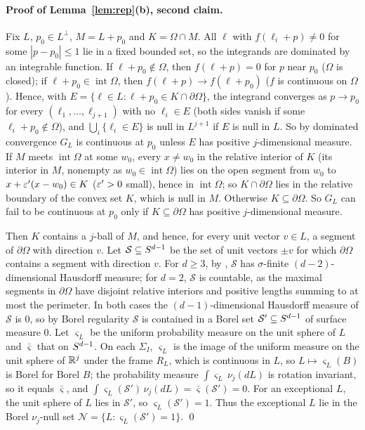 \documentclass[11pt]{article}
\begin{document}
\paragraph{Proof of Lemma~\ref{lem:rep}(b), second claim.} Fix $L$, $p_0\in L^\perp$, $M=L+p_0$ and $K=\Omega\cap M$. All $\ell$ with
$f(\ell_i+p)\ne0$ for some $|p-p_0|\le1$ lie in a fixed bounded set, so the integrands are dominated by an integrable function. If
$\ell+p_0\notin\Omega$, then $f(\ell+p)=0$ for $p$ near $p_0$ ($\Omega$ is closed); if $\ell+p_0\in\operatorname{int}\Omega$, then $f(\ell+p)\to f(\ell+p_0)$ ($f$
is continuous on $\Omega$). Hence, with $E=\{\ell\in L:\ell+p_0\in K\cap\partial\Omega\}$, the integrand converges as $p\to p_0$ for every $(\ell_1,\dots,\ell_{j+1})$
with no $\ell_i\in E$ (both sides vanish if some $\ell_i+p_0\notin\Omega$), and $\bigcup_i\{\ell_i\in E\}$ is null in $L^{j+1}$ if $E$ is null in $L$.
So by dominated convergence $G_L$ is continuous at $p_0$ unless $E$ has positive $j$-dimensional measure. If $M$ meets $\operatorname{int}\Omega$ at some $w_0$, every $x\ne w_0$ in the relative interior of $K$ (its interior in $M$, nonempty as $w_0\in\operatorname{int}\Omega$) lies on the open
segment from $w_0$ to $x+\varepsilon'(x-w_0)\in K$ ($\varepsilon'>0$ small), hence in $\operatorname{int}\Omega$; so $K\cap\partial\Omega$ lies in the relative boundary of
the convex set $K$, which is null in $M$. Otherwise $K\subseteq\partial\Omega$. So $G_L$ can fail to be continuous at $p_0$ only if $K\subseteq\partial\Omega$
has positive $j$-dimensional measure.

Then $K$ contains a $j$-ball of $M$, and hence, for every unit vector $v\in L$, a segment of $\partial\Omega$ with direction $v$. Let
$\mathcal S\subseteq S^{d-1}$ be the set of unit vectors $\pm v$ for which $\partial\Omega$ contains a segment with direction $v$. For $d\ge3$, by
\cite[Theorem~1]{ELR}, $\mathcal S$ has $\sigma$-finite $(d-2)$-dimensional Hausdorff measure; for $d=2$, $\mathcal S$ is countable, as the maximal
segments in $\partial\Omega$ have disjoint relative interiors and positive lengths summing to at most the perimeter. In both cases the
$(d-1)$-dimensional Hausdorff measure of $\mathcal S$ is $0$, so by Borel regularity $\mathcal S$ is contained in a Borel set $\mathcal S'\subseteq S^{d-1}$
of surface measure $0$. Let $\varsigma_L$ be the uniform probability measure on the unit sphere of $L$ and $\bar\varsigma$ that on $S^{d-1}$.
On each $\Sigma_I$, $\varsigma_L$ is the image of the uniform measure on the unit sphere of $\mathbb{R}^j$ under the frame $R_L$, which is
continuous in $L$, so $L\mapsto\varsigma_L(B)$ is Borel for Borel $B$; the probability measure $\int\varsigma_L\,\nu_j(dL)$ is
rotation invariant, so it equals $\bar\varsigma$, and $\int\varsigma_L(\mathcal S')\,\nu_j(dL)=\bar\varsigma(\mathcal S')=0$. For an exceptional $L$, the unit
sphere of $L$ lies in $\mathcal S'$, so $\varsigma_L(\mathcal S')=1$. Thus the exceptional $L$ lie in the Borel $\nu_j$-null set
$\mathcal N=\{L:\varsigma_L(\mathcal S')=1\}$.
\qed
\end{document}
